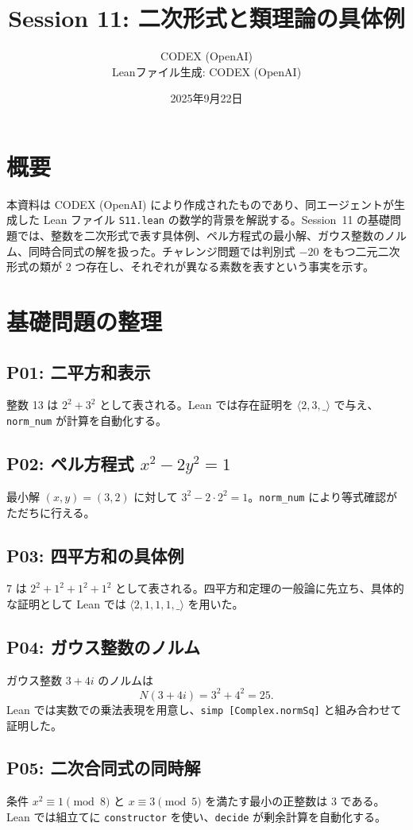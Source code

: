 \documentclass[a4paper]{ltjsarticle}
\title{Session 11: 二次形式と類理論の具体例}
\author{CODEX (OpenAI)\\Leanファイル生成: CODEX (OpenAI)}
\date{2025年9月22日}
\begin{document}
\maketitle

\tableofcontents

\section{概要}
本資料は CODEX (OpenAI) により作成されたものであり、同エージェントが生成した Lean ファイル \texttt{S11.lean} の数学的背景を解説する。Session~11 の基礎問題では、整数を二次形式で表す具体例、ペル方程式の最小解、ガウス整数のノルム、同時合同式の解を扱った。チャレンジ問題では判別式 \(-20\) をもつ二元二次形式の類が 2 つ存在し、それぞれが異なる素数を表すという事実を示す。

\section{基礎問題の整理}
\subsection{P01: 二平方和表示}
整数 13 は \(2^2 + 3^2\) として表される。Lean では存在証明を \(\langle 2,3,\_ \rangle\) で与え、\texttt{norm\_num} が計算を自動化する。

\subsection{P02: ペル方程式 \(x^2 - 2y^2 = 1\)}
最小解 \((x,y) = (3,2)\) に対して \(3^2 - 2\cdot 2^2 = 1\)。\texttt{norm\_num} により等式確認がただちに行える。

\subsection{P03: 四平方和の具体例}
7 は \(2^2 + 1^2 + 1^2 + 1^2\) として表される。四平方和定理の一般論に先立ち、具体的な証明として Lean では \(\langle 2,1,1,1,\_ \rangle\) を用いた。

\subsection{P04: ガウス整数のノルム}
ガウス整数 \(3 + 4i\) のノルムは
\[
N(3 + 4i) = 3^2 + 4^2 = 25.
\]
Lean では実数での乗法表現を用意し、\texttt{simp [Complex.normSq]} と組み合わせて証明した。

\subsection{P05: 二次合同式の同時解}
条件 \(x^2 \equiv 1 \pmod{8}\) と \(x \equiv 3 \pmod{5}\) を満たす最小の正整数は 3 である。Lean では組立てに \texttt{constructor} を使い、\texttt{decide} が剰余計算を自動化する。
\end{document}
